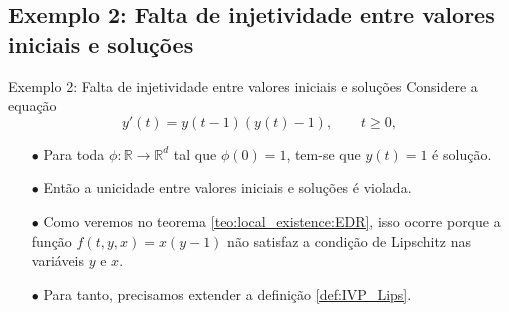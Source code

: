 \documentclass{beamer}
\newcommand{\R}{\mathbb{R}}
\theoremstyle{plain}
\theoremstyle{definition}
\begin{document}

\subsection{Exemplo 2: Falta de injetividade entre valores iniciais e soluções}
\begin{frame}{Exemplo 2: Falta de injetividade entre valores iniciais e soluções}
        Considere a equação
        \begin{equation}
            y'(t) = y(t - 1) (y(t) - 1), \qquad t \geq 0,
            \label{chap1:ex2:eq:1}
        \end{equation}
        \begin{itemize}
            \item[$\bullet$] Para toda $\phi:\R \to \R^d$ tal que $\phi(0) = 1$, tem-se que $y(t) = 1$ é solução.
            \item[$\bullet$] Então a unicidade entre valores iniciais e soluções é violada. 
            \item[$\bullet$] Como veremos no teorema \ref{teo:local_existence:EDR}, isso ocorre porque a função $f(t, y, x) = x(y - 1)$ não satisfaz a condição de Lipschitz nas variáveis $y$ e $x$. 
            \item[$\bullet$] Para tanto, precisamos extender a definição \ref{def:IVP_Lips}.
        \end{itemize} 
\end{frame}

\end{document}
